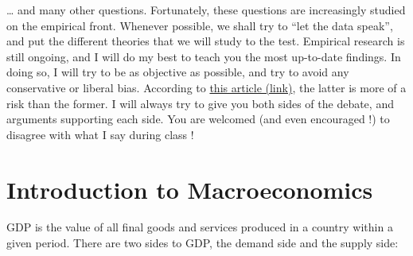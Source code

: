 \documentclass[]{book}
\begin{document}
\ldots{} and many other questions. Fortunately, these questions are
increasingly studied on the empirical front. Whenever possible, we shall
try to ``let the data speak'', and put the different theories that we
will study to the test. Empirical research is still ongoing, and I will
do my best to teach you the most up-to-date findings. In doing so, I
will try to be as objective as possible, and try to avoid any
conservative or liberal bias. According to
\href{https://www.bloomberg.com/view/articles/2018-09-17/colleges-have-way-too-many-liberal-professors}{this
article (link)}, the latter is more of a risk than the former. I will
always try to give you both sides of the debate, and arguments
supporting each side. You are welcomed (and even encouraged !) to
disagree with what I say during class !

\chapter{Introduction to Macroeconomics}\label{intro-cobb}

GDP is the value of all final goods and services produced in a country
within a given period. There are two sides to GDP, the demand side and
the supply side:
\end{document}
